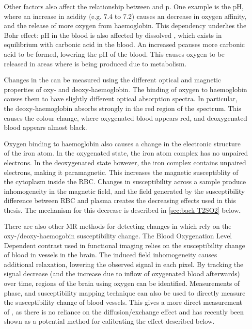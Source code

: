 Other factors also affect the relationship between \SOtwo and p\Otwo. \cite{HallGuytonHallTextbook2015}
One example is the pH, where an increase in acidity (e.g. 7.4 to 7.2) causes an decrease in oxygen affinity, and the release of more oxygen from haemoglobin.
This dependency underlies the Bohr effect:
pH in the blood is also affected by dissolved \COtwo, which exists in equilibrium with carbonic acid in the blood.
An increased p\COtwo causes more carbonic acid to be formed, lowering the pH of the blood.
This causes oxygen to be released in areas where \COtwo is being produced due to metabolism.

Changes in the \SOtwo can be measured using the different optical and magnetic properties of oxy- and deoxy-haemoglobin.
The binding of oxygen to haemoglobin causes them to have slightly different optical absorption spectra.
In particular, the deoxy-haemoglobin absorbs strongly in the red region of the spectrum.
This causes the colour change, where oxygenated blood appears red, and deoxygenated blood appears almost black.

Oxygen binding to haemoglobin also causes a change in the electronic structure of the iron atom. \cite{PaulingMagneticPropertiesStructure1936}
In the oxygenated state, the iron atom complex has no unpaired electrons.
In the deoxygenated state however, the iron complex contains unpaired electrons, making it paramagnetic.
This increases the magnetic susceptiblity of the cytoplasm inside the RBC.
Changes in susceptibility across a sample produce inhomogeneity in the \Bzero magnetic field, and the field generated by the susceptibility difference between RBC and plasma creates the decreasing \Ttwo effects used in this thesis.
The mechanism for this decrease is described in \autoref{sec:back-T2SO2} below.

There are also other MR methods for detecting changes in \SOtwo which rely on the oxy-/deoxy-haemogobin susceptibility change.
The Blood Oxygenation Level Dependent contrast used in functional imaging relies on the susceptibility change of blood in vessels in the brain.
The induced field inhomogeneity causes additional \Ttwostar relaxation, lowering the observed signal in each pixel.
By tracking the signal decrease (and the increase due to inflow of oxygenated blood afterwards) over time, regions of the brain using oxygen can be identified.
Measurements of phase, and susceptibility mapping technique can also be used to directly measure the susceptibility change of blood vessels\cite{Haackevivomeasurementblood1997,Fernandez-SearaMRsusceptometrymeasuring2006a,JainInvestigatingmagneticsusceptibility2012}.
This gives a more direct measurement of \SOtwo, as there is no reliance on the diffusion/exchange effect and has recently been shown as a potential method for calibrating the \Ttwo effect described below.\cite{LanghamvivowholebloodT22018}

